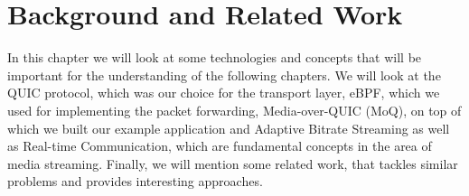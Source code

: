 
\chapter{Background and Related Work}\label{chap:background}

In this chapter we will look at some technologies and concepts 
that will be important for the understanding of the following chapters.
We will look at the QUIC protocol, which was our choice for the 
transport layer, eBPF, which we used for implementing the packet 
forwarding, Media-over-QUIC (MoQ), on top of which we built 
our example application and Adaptive Bitrate Streaming as well as 
Real-time Communication, which are fundamental concepts in the area 
of media streaming.
Finally, we will mention some related work, that tackles similar 
problems and provides interesting approaches.  






